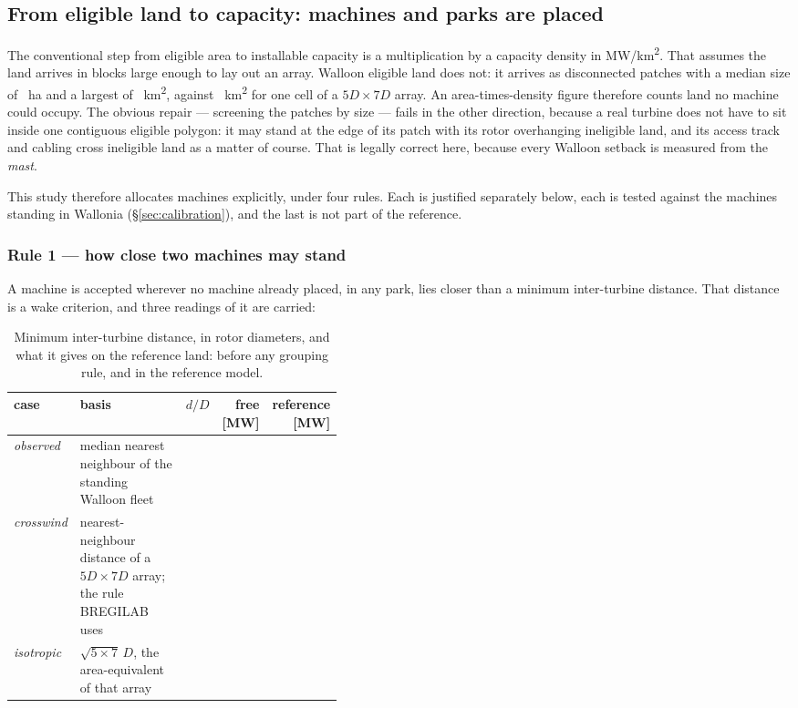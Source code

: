 \documentclass[11pt,a4paper]{article}
\begin{document}
\subsection{From eligible land to capacity: machines and parks are placed}
\label{sec:placement}

The conventional step from eligible area to installable capacity is a
multiplication by a capacity density in MW/\si{\square\kilo\metre}. That
assumes the land arrives in blocks large enough to lay out an array. Walloon
eligible land does not: it arrives as \NPatches{} disconnected patches with a
median size of \MedianPatch{}~ha and a largest of
\LargestPatch{}~\si{\square\kilo\metre}, against
\Footprint{}~\si{\square\kilo\metre} for one cell of a $5D\times7D$ array. An
area-times-density figure therefore counts land no machine could occupy. The
obvious repair --- screening the patches by size --- fails in the other
direction, because a real turbine does not have to sit inside one contiguous
eligible polygon: it may stand at the edge of its patch with its rotor
overhanging ineligible land, and its access track and cabling cross ineligible
land as a matter of course. That is legally correct here, because every Walloon
setback is measured from the \emph{mast}.

This study therefore allocates machines explicitly, under four rules. Each is
justified separately below, each is tested against the \FleetN{} machines
standing in Wallonia (§\ref{sec:calibration}), and the last is not part of the
reference.

\subsubsection{Rule 1 --- how close two machines may stand}

A machine is accepted wherever no machine already placed, in any park, lies
closer than a minimum inter-turbine distance. That distance is a wake
criterion, and three readings of it are carried:

\begin{table}[htbp]\centering\small
\caption{Minimum inter-turbine distance, in rotor diameters, and what it gives
on the reference land: before any grouping rule, and in the reference model.}
\label{tab:spacing}
\begin{tabular}{lp{0.42\linewidth}rrr}
\toprule
case & basis & $d/D$ & free [\si{\mega\watt}] & reference [\si{\mega\watt}] \\
\midrule
\emph{observed} & median nearest neighbour of the standing Walloon fleet
  & \SpObsD{} & \SpObsFree{} & \SpObsMW{} \\
\emph{crosswind} & nearest-neighbour distance of a $5D\times7D$ array; the rule
  BREGILAB uses & \SpCrossD{} & \SpCrossFree{} & \SpCrossMW{} \\
\emph{isotropic} & $\sqrt{5\times7}\,D$, the area-equivalent of that array
  & \SpIsoD{} & \SpIsoFree{} & \SpIsoMW{} \\
\bottomrule
\end{tabular}
\end{table}
\end{document}
